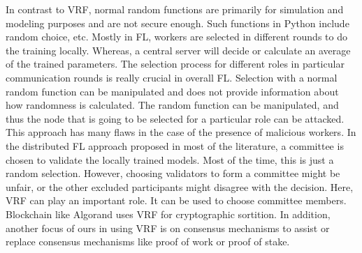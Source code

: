 In contrast to VRF, normal random functions are primarily for simulation and modeling purposes and are not secure enough.
Such functions in Python include random choice, etc. 
Mostly in FL, 
workers are selected in different rounds to do the training locally.
Whereas, a central server will decide or calculate an average of the trained parameters.
The selection process for different roles in particular communication rounds is really crucial in overall FL.
Selection with a normal random function can be manipulated and does not provide information about
how randomness is calculated.
The random function can be manipulated, and thus the node that is going to be selected for
a particular role can be attacked.
This approach has many flaws in the case of the presence of malicious workers.
In the distributed FL approach proposed in most of the literature, 
a committee is chosen to validate the locally trained models.
Most of the time, this is just a random selection.
However, choosing validators to form a committee might be unfair, or the other excluded participants might disagree with the decision.
Here, VRF can play an important role.
It can be used to choose committee members.
Blockchain like Algorand 
uses VRF for cryptographic sortition.
In addition, another focus of ours in using VRF is on consensus mechanisms to assist or replace consensus mechanisms like proof of work or proof of stake.


